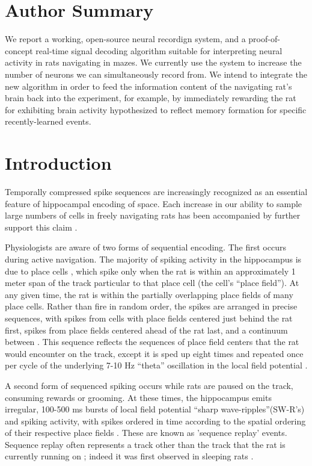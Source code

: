 \documentclass[10pt]{article}
\begin{document}
\section*{Author Summary}
We report a working, open-source neural recordign system, and a proof-of-concept real-time signal decoding algorithm suitable for interpreting neural activity in rats navigating in mazes. We currently use the system to increase the number of neurons we can simultaneously record from. We intend to integrate the new algorithm in order to feed the information content of the navigating rat's brain back into the experiment, for example, by immediately rewarding the rat for exhibiting brain activity hypothesized to reflect memory formation for specific recently-learned events.

\section*{Introduction}
Temporally compressed spike sequences are increasingly recognized as an essential feature of hippocampal encoding of space. Each increase in our ability to sample large numbers of cells in freely navigating rats has been accompanied by further support this claim \cite{wilson1993dynamics, miller2008all}.

Physiologists are aware of two forms of sequential encoding. The first occurs during active navigation. The majority \cite{thompson1989place} of spiking activity in the hippocampus is due to place cells \cite{okeefe1971the}, which spike only when the rat is within an approximately 1 meter span of the track particular to that place cell (the cell's ``place field''). At any given time, the rat is within the partially overlapping place fields of many place cells. Rather than fire in random order, the spikes are arranged in precise sequences, with spikes from cells with place fields centered just behind the rat first, spikes from place fields centered ahead of the rat last, and a continuum between \cite{skaggs1996theta}. This sequence reflects the sequences of place field centers that the rat would encounter on the track, except it is sped up eight times and repeated once per cycle of the underlying 7-10 Hz ``theta'' oscillation in the local field potential \cite{dragoi2006temporal, foster2007hippocampal}. 

A second form of sequenced spiking occurs while rats are paused on the track, consuming rewards or grooming. At these times, the hippocampus emits irregular, 100-500 ms bursts of local field potential ``sharp wave-ripples''(SW-R's) and spiking activity, with spikes ordered in time according to the spatial ordering of their respective place fields \cite{foster2006reverse, diba2007forward}. These are known as 'sequence replay' events. Sequence replay often represents a track other than the track that the rat is currently running on \cite{karlsson2009awake}; indeed it was first observed in sleeping rats \cite{lee2002memory}.
\end{document}
